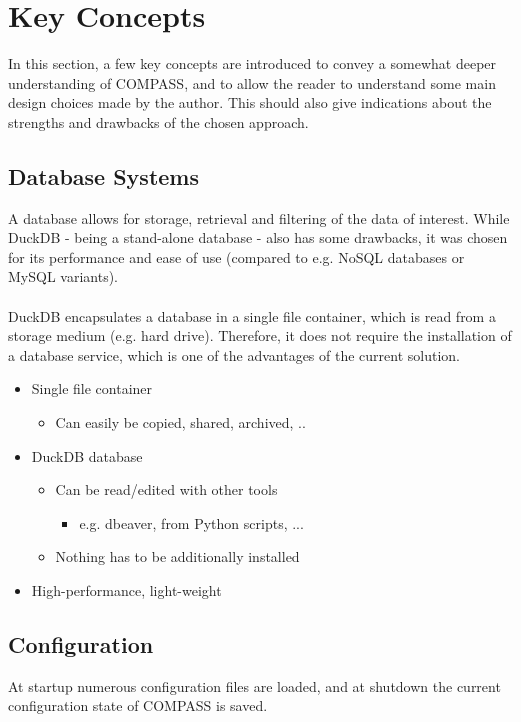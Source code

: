 \section{Key Concepts}
\label{sec:key_concepts}

In this section, a few key concepts are introduced to convey a somewhat deeper understanding of COMPASS, and to allow the reader to understand some main design choices made by the author. 
This should also give indications about the strengths and drawbacks of the chosen approach.

\subsection*{Database Systems}
A database allows for storage, retrieval and filtering of the data of interest. While DuckDB - being a stand-alone database - also has some drawbacks, 
it was chosen for its performance and ease of use (compared to e.g. NoSQL databases or MySQL variants). \\\\
DuckDB encapsulates a database in a single file container, which is read from a storage medium (e.g. hard drive). 
Therefore, it does not require the installation of a database service, which is one of the advantages of the current solution. \\

\begin{itemize}
\item Single file container
\begin{itemize}
\item Can easily be copied, shared, archived, ..
\end{itemize}
\item DuckDB database
\begin{itemize}
\item Can be read/edited with other tools
\begin{itemize}
\item e.g. dbeaver, from Python scripts, ...
\end{itemize}
\item Nothing has to be additionally installed
\end{itemize}
\item High-performance, light-weight
\end{itemize}

\subsection*{Configuration}
At startup numerous configuration files are loaded, and at shutdown the current configuration state of COMPASS is saved.\\\\

